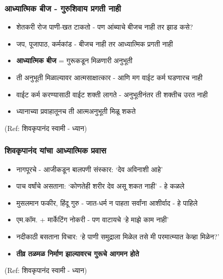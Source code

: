\begin{frame}[fragile]\frametitle{आध्यात्मिक बीज - गुरुशिवाय प्रगती नाही}

	\begin{itemize}
	\item शेतकरी रोज पाणी-खत टाकतो - पण आंब्याचे बीजच नाही तर झाड कसे?
	\item जप, पूजापाठ, कर्मकांड - बीजच नाही तर आध्यात्मिक प्रगती नाही
	\item \textbf{आध्यात्मिक बीज} = गुरूकडून मिळणारी अनुभूती
	\item ती अनुभूती मिळाल्यावर आत्मसाक्षात्कार - आणि मग वाईट कर्म घडणारच नाही
	\item वाईट कर्म करण्यासाठी वाईट शक्ती लागते - अनुभूतीनंतर ती शक्तीच उरत नाही
	\item ध्यानाच्या प्रवाहातूनच ती आत्मअनुभूती मिळू शकते
	\end{itemize}

{\tiny (Ref: शिवकृपानंद स्वामी - ध्यान)}

\end{frame}

\begin{frame}[fragile]\frametitle{शिवकृपानंद यांचा आध्यात्मिक प्रवास}

	\begin{itemize}
	\item नागपूरचे - आजीकडून बालपणी संस्कार: `देव अविनाशी आहे'
	\item पाच वर्षांचे असताना: `कोणतेही शरीर देव असू शकत नाही' - हे कळले
	\item मुसलमान फकीर, हिंदू गुरु - जात-धर्म न पाहता सर्वांना आशीर्वाद - हे पाहिले
	\item एम.कॉम. + मार्केटिंग नोकरी - पण वाटायचे `हे माझे काम नाही'
	\item नदीकाठी बसताना विचार: `हे पाणी समुद्राला मिळेल तसे मी परमात्म्यात केव्हा मिळेन?'
	\item \textbf{तीव्र तळमळ निर्माण झाल्यावरच गुरूचे आगमन होते}
	\end{itemize}

{\tiny (Ref: शिवकृपानंद स्वामी - ध्यान)}

\end{frame}

